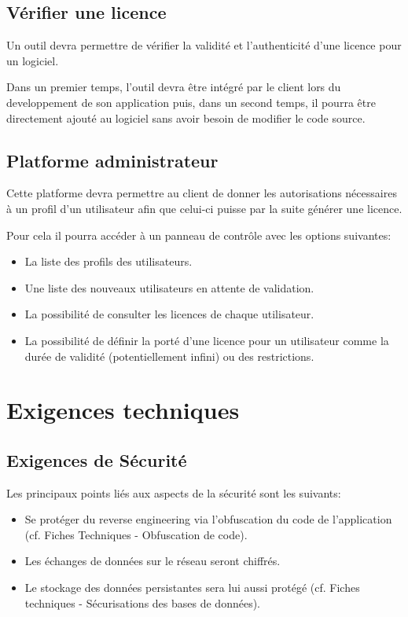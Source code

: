 \section{Vérifier une licence}
Un outil devra permettre de vérifier la validité et l'authenticité d'une licence pour un logiciel. \newline

Dans un premier temps, l'outil devra être intégré par le client lors du developpement de son application puis, dans un second temps, il pourra être directement ajouté au logiciel sans avoir besoin de modifier le code source.

\section{Platforme administrateur}
Cette platforme devra permettre au client de donner les autorisations nécessaires à un profil d'un utilisateur afin que celui-ci puisse par la suite générer une licence.

Pour cela il pourra accéder à un panneau de contrôle avec les options suivantes:

\begin{itemize}
	\item La liste des profils des utilisateurs.
	\item Une liste des nouveaux utilisateurs en attente de validation.
	\item La possibilité de consulter les licences de chaque utilisateur.
	\item La possibilité de définir la porté d'une licence pour un utilisateur comme la durée de validité (potentiellement infini) ou des restrictions.
\end{itemize}
\newpage

\chapter{Exigences techniques}

\section{Exigences de Sécurité}
Les principaux points liés aux aspects de la sécurité sont les suivants:
\begin{itemize}
	\item Se protéger du reverse engineering via l'obfuscation du code de l'application (cf. Fiches Techniques - Obfuscation de code).
	\item Les échanges de données sur le réseau seront chiffrés.
	\item Le stockage des données persistantes sera lui aussi protégé (cf. Fiches techniques - Sécurisations des bases de données).
\end{itemize}

